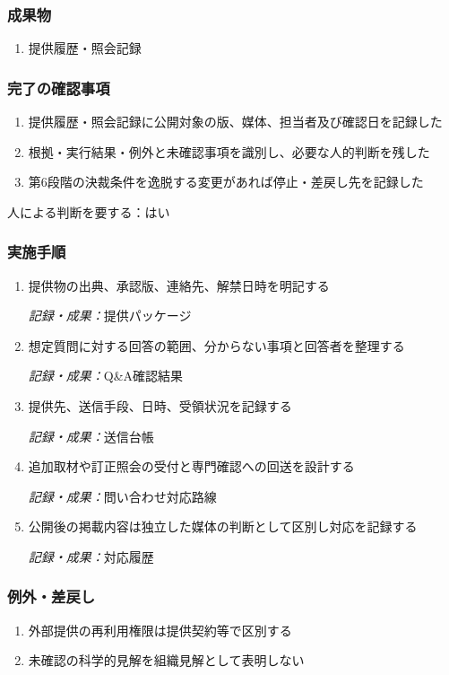 \documentclass[a4paper,11pt]{article}
\begin{document}
\subsubsection*{成果物}
\begin{enumerate}[leftmargin=2em,itemsep=0.35em]
\item 提供履歴・照会記録
\end{enumerate}
\subsubsection*{完了の確認事項}
\begin{enumerate}[leftmargin=2em,itemsep=0.35em]
\item 提供履歴・照会記録に公開対象の版、媒体、担当者及び確認日を記録した
\item 根拠・実行結果・例外と未確認事項を識別し、必要な人的判断を残した
\item 第6段階の決裁条件を逸脱する変更があれば停止・差戻し先を記録した
\end{enumerate}
\par 人による判断を要する：はい\par\medskip
\subsubsection*{実施手順}
\begin{enumerate}[leftmargin=2em,itemsep=0.65em]
\item 提供物の出典、承認版、連絡先、解禁日時を明記する\par\noindent\textit{記録・成果：}提供パッケージ\nobreak\smallskip
\item 想定質問に対する回答の範囲、分からない事項と回答者を整理する\par\noindent\textit{記録・成果：}Q\&A確認結果\nobreak\smallskip
\item 提供先、送信手段、日時、受領状況を記録する\par\noindent\textit{記録・成果：}送信台帳\nobreak\smallskip
\item 追加取材や訂正照会の受付と専門確認への回送を設計する\par\noindent\textit{記録・成果：}問い合わせ対応路線\nobreak\smallskip
\item 公開後の掲載内容は独立した媒体の判断として区別し対応を記録する\par\noindent\textit{記録・成果：}対応履歴\nobreak\smallskip
\end{enumerate}
\subsubsection*{例外・差戻し}
\begin{enumerate}[leftmargin=2em,itemsep=0.35em]
\item 外部提供の再利用権限は提供契約等で区別する
\item 未確認の科学的見解を組織見解として表明しない
\end{enumerate}
\end{document}
